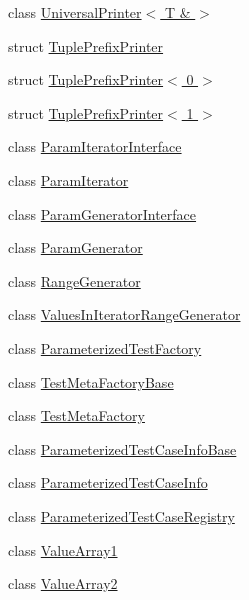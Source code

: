 \begin{DoxyCompactItemize}
\item 
class \hyperlink{classtesting_1_1internal_1_1UniversalPrinter_3_01T_01_6_01_4}{\-Universal\-Printer$<$ T \& $>$}
\item 
struct \hyperlink{structtesting_1_1internal_1_1TuplePrefixPrinter}{\-Tuple\-Prefix\-Printer}
\item 
struct \hyperlink{structtesting_1_1internal_1_1TuplePrefixPrinter_3_010_01_4}{\-Tuple\-Prefix\-Printer$<$ 0 $>$}
\item 
struct \hyperlink{structtesting_1_1internal_1_1TuplePrefixPrinter_3_011_01_4}{\-Tuple\-Prefix\-Printer$<$ 1 $>$}
\item 
class \hyperlink{classtesting_1_1internal_1_1ParamIteratorInterface}{\-Param\-Iterator\-Interface}
\item 
class \hyperlink{classtesting_1_1internal_1_1ParamIterator}{\-Param\-Iterator}
\item 
class \hyperlink{classtesting_1_1internal_1_1ParamGeneratorInterface}{\-Param\-Generator\-Interface}
\item 
class \hyperlink{classtesting_1_1internal_1_1ParamGenerator}{\-Param\-Generator}
\item 
class \hyperlink{classtesting_1_1internal_1_1RangeGenerator}{\-Range\-Generator}
\item 
class \hyperlink{classtesting_1_1internal_1_1ValuesInIteratorRangeGenerator}{\-Values\-In\-Iterator\-Range\-Generator}
\item 
class \hyperlink{classtesting_1_1internal_1_1ParameterizedTestFactory}{\-Parameterized\-Test\-Factory}
\item 
class \hyperlink{classtesting_1_1internal_1_1TestMetaFactoryBase}{\-Test\-Meta\-Factory\-Base}
\item 
class \hyperlink{classtesting_1_1internal_1_1TestMetaFactory}{\-Test\-Meta\-Factory}
\item 
class \hyperlink{classtesting_1_1internal_1_1ParameterizedTestCaseInfoBase}{\-Parameterized\-Test\-Case\-Info\-Base}
\item 
class \hyperlink{classtesting_1_1internal_1_1ParameterizedTestCaseInfo}{\-Parameterized\-Test\-Case\-Info}
\item 
class \hyperlink{classtesting_1_1internal_1_1ParameterizedTestCaseRegistry}{\-Parameterized\-Test\-Case\-Registry}
\item 
class \hyperlink{classtesting_1_1internal_1_1ValueArray1}{\-Value\-Array1}
\item 
class \hyperlink{classtesting_1_1internal_1_1ValueArray2}{\-Value\-Array2}

\end{DoxyCompactItemize}
